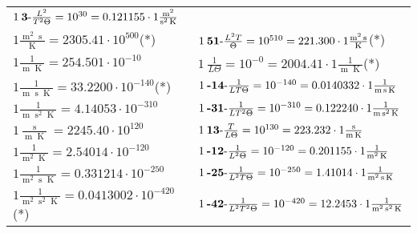 \begin{center}
\begin{longtable}{l l}
	{\color{black}$1\:\text{\textbf{3}-} \frac{L^2}{T^2\Theta}=10^{30} = 0.121155 \cdot 1 \bm{\mathrm{ }}\frac{\operatorname{m}^2}{\operatorname{s}^2\operatorname{K}}$}\\
{\color{black}$1 \bm{\mathrm{ }}\frac{\operatorname{m}^2\operatorname{s}}{\operatorname{K}} = 2305.41\cdot10^{500} $}\quad(*)&
	{\color{black}$1\:\text{\textbf{51}-} \frac{L^2T}{\Theta}=10^{510} = 221.300 \cdot 1 \bm{\mathrm{ }}\frac{\operatorname{m}^2\operatorname{s}}{\operatorname{K}}$}\quad(*)\\
{\color{black}$1 \bm{\mathrm{ }}\frac1{\operatorname{m}\operatorname{K}} = 254.501\cdot10^{-10} $}&
	{\color{black}$1\:\text{} \frac1{L\Theta}=10^{-0} = 2004.41 \cdot 1 \bm{\mathrm{ }}\frac1{\operatorname{m}\operatorname{K}}$}\quad(*)\\
{\color{black}$1 \bm{\mathrm{ }}\frac1{\operatorname{m}\operatorname{s}\operatorname{K}} = 33.2200\cdot10^{-140} $}\quad(*)&
	{\color{black}$1\:\text{\textbf{-14}-} \frac1{LT\Theta}=10^{-140} = 0.0140332 \cdot 1 \bm{\mathrm{ }}\frac1{\operatorname{m}\operatorname{s}\operatorname{K}}$}\\
{\color{black}$1 \bm{\mathrm{ }}\frac1{\operatorname{m}\operatorname{s}^2\operatorname{K}} = 4.14053\cdot10^{-310} $}&
	{\color{black}$1\:\text{\textbf{-31}-} \frac1{LT^2\Theta}=10^{-310} = 0.122240 \cdot 1 \bm{\mathrm{ }}\frac1{\operatorname{m}\operatorname{s}^2\operatorname{K}}$}\\
{\color{black}$1 \bm{\mathrm{ }}\frac{\operatorname{s}}{\operatorname{m}\operatorname{K}} = 2245.40\cdot10^{120} $}&
	{\color{black}$1\:\text{\textbf{13}-} \frac{T}{L\Theta}=10^{130} = 223.232 \cdot 1 \bm{\mathrm{ }}\frac{\operatorname{s}}{\operatorname{m}\operatorname{K}}$}\\
{\color{black}$1 \bm{\mathrm{ }}\frac1{\operatorname{m}^2\operatorname{K}} = 2.54014\cdot10^{-120} $}&
	{\color{black}$1\:\text{\textbf{-12}-} \frac1{L^2\Theta}=10^{-120} = 0.201155 \cdot 1 \bm{\mathrm{ }}\frac1{\operatorname{m}^2\operatorname{K}}$}\\
{\color{black}$1 \bm{\mathrm{ }}\frac1{\operatorname{m}^2\operatorname{s}\operatorname{K}} = 0.331214\cdot10^{-250} $}&
	{\color{black}$1\:\text{\textbf{-25}-} \frac1{L^2T\Theta}=10^{-250} = 1.41014 \cdot 1 \bm{\mathrm{ }}\frac1{\operatorname{m}^2\operatorname{s}\operatorname{K}}$}\\
{\color{black}$1 \bm{\mathrm{ }}\frac1{\operatorname{m}^2\operatorname{s}^2\operatorname{K}} = 0.0413002\cdot10^{-420} $}\quad(*)&
	{\color{black}$1\:\text{\textbf{-42}-} \frac1{L^2T^2\Theta}=10^{-420} = 12.2453 \cdot 1 \bm{\mathrm{ }}\frac1{\operatorname{m}^2\operatorname{s}^2\operatorname{K}}$}\\

\end{longtable}
\end{center}
